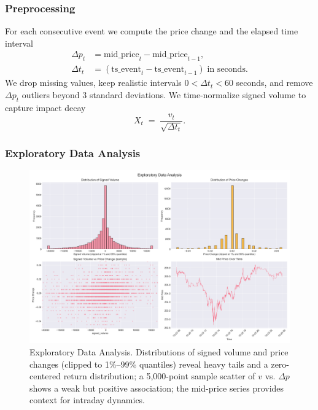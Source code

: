 \documentclass{article}
\begin{document}
\subsubsection{Preprocessing}
For each consecutive event we compute the price change and the elapsed time interval
\begin{align}
\Delta p_t &= \text{mid\_price}_t - \text{mid\_price}_{t-1},\\
\Delta t_t &= (\text{ts\_event}_t - \text{ts\_event}_{t-1})\;\text{in seconds}.
\end{align}
We drop missing values, keep realistic intervals \(0 < \Delta t_t < 60\) seconds, and remove \(\Delta p_t\) outliers beyond 3 standard deviations. We time-normalize signed volume to capture impact decay
\begin{equation}
X_t \;=\; \frac{v_t}{\sqrt{\Delta t_t}}.
\end{equation}

\subsubsection{Exploratory Data Analysis}
\begin{figure}[H]
\centering
\includegraphics[width=\textwidth]{figures/01_exploratory_analysis.png}
\caption{Exploratory Data Analysis. Distributions of signed volume and price changes (clipped to 1\%--99\% quantiles) reveal heavy tails and a zero-centered return distribution; a 5{,}000-point sample scatter of $v$ vs. $\Delta p$ shows a weak but positive association; the mid-price series provides context for intraday dynamics.}
\label{fig:eda}
\end{figure}
\end{document}
